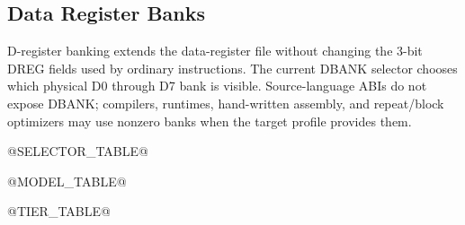 \subsection{Data Register Banks}
D-register banking extends the data-register file without changing the 3-bit DREG fields used by ordinary
instructions. The current DBANK selector chooses which physical D0 through D7 bank is visible.
Source-language ABIs do not expose DBANK; compilers, runtimes, hand-written assembly, and repeat/block
optimizers may use nonzero banks when the target profile provides them.

@SELECTOR_TABLE@

@MODEL_TABLE@

@TIER_TABLE@
